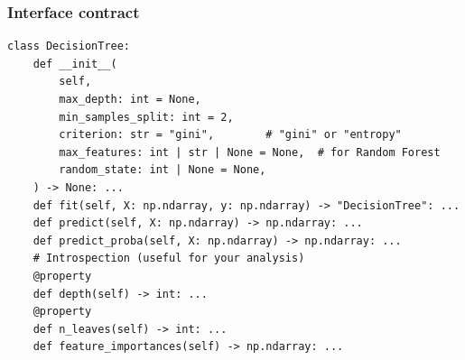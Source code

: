 \documentclass[11pt,a4paper]{article}
\begin{document}
\subsubsection{Interface contract}
\begin{lstlisting}[style=python]
class DecisionTree:
    def __init__(
        self,
        max_depth: int = None,
        min_samples_split: int = 2,
        criterion: str = "gini",        # "gini" or "entropy"
        max_features: int | str | None = None,  # for Random Forest
        random_state: int | None = None,
    ) -> None: ...
    def fit(self, X: np.ndarray, y: np.ndarray) -> "DecisionTree": ...
    def predict(self, X: np.ndarray) -> np.ndarray: ...
    def predict_proba(self, X: np.ndarray) -> np.ndarray: ...
    # Introspection (useful for your analysis)
    @property
    def depth(self) -> int: ...
    @property
    def n_leaves(self) -> int: ...
    def feature_importances(self) -> np.ndarray: ...
\end{lstlisting}
\end{document}
